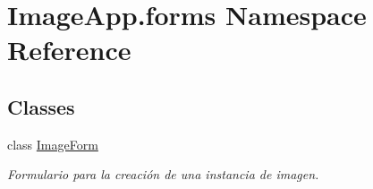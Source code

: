 \hypertarget{namespace_image_app_1_1forms}{}\section{Image\+App.\+forms Namespace Reference}
\label{namespace_image_app_1_1forms}
\subsection*{Classes}
\begin{DoxyCompactItemize}
\item 
class \mbox{\hyperlink{class_image_app_1_1forms_1_1_image_form}{Image\+Form}}
\begin{DoxyCompactList}\small\item\em Formulario para la creación de una instancia de imagen. \end{DoxyCompactList}\end{DoxyCompactItemize}
